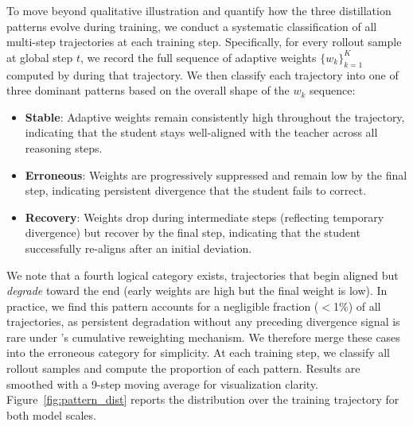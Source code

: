 To move beyond qualitative illustration and quantify how the three distillation patterns evolve during training, we conduct a systematic classification of all multi-step trajectories at each training step. Specifically, for every rollout sample at global step $t$, we record the full sequence of adaptive weights $\{w_k\}_{k=1}^{K}$ computed by \ourmodel during that trajectory. We then classify each trajectory into one of three dominant patterns based on the overall shape of the $w_k$ sequence:

\begin{itemize}[leftmargin=1.5em, itemsep=2pt]
    \item \textbf{Stable}: Adaptive weights remain consistently high throughout the trajectory, indicating that the student stays well-aligned with the teacher across all reasoning steps.
    \item \textbf{Erroneous}: Weights are progressively suppressed and remain low by the final step, indicating persistent divergence that the student fails to correct.
    \item \textbf{Recovery}: Weights drop during intermediate steps (reflecting temporary divergence) but recover by the final step, indicating that the student successfully re-aligns after an initial deviation.
\end{itemize}

\noindent We note that a fourth logical category exists, \ie trajectories that begin aligned but \emph{degrade} toward the end (\ie early weights are high but the final weight is low). In practice, we find this pattern accounts for a negligible fraction ($<$1\%) of all trajectories, as persistent degradation without any preceding divergence signal is rare under \ourmodel's cumulative reweighting mechanism. We therefore merge these cases into the erroneous category for simplicity.
At each training step, we classify all rollout samples and compute the proportion of each pattern. Results are smoothed with a 9-step moving average for visualization clarity. Figure~\ref{fig:pattern_dist} reports the distribution over the training trajectory for both model scales.





